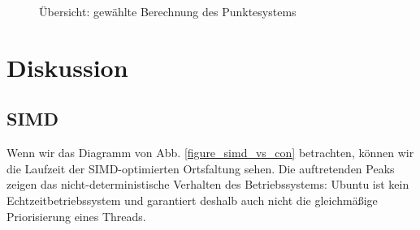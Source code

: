 \documentclass[a4paper,12pt]{article}
\begin{document}
\begin{figure}[htbp]
\caption{Übersicht: gewählte Berechnung des Punktesystems}%
\label{figure_konv_subimage}
\end{figure}



\newpage

\section{Diskussion}
\subsection{SIMD}
Wenn wir das Diagramm von Abb. \ref{figure_simd_vs_con} betrachten, können wir
die Laufzeit der SIMD-optimierten Ortsfaltung sehen. Die auftretenden Peaks
zeigen das nicht-deterministische Verhalten des Betriebssystems: Ubuntu ist kein
Echtzeitbetriebssystem und garantiert deshalb auch nicht die gleichmäßige
Priorisierung eines Threads. 
\end{document}
